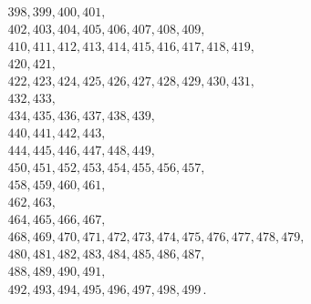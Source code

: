 \begin{multline}
398, 399, 400, 401, \\
402, 403, 404, 405, 406, 407, 408, 409, \\
410, 411, 412, 413, 414, 415, 416, 417, 418, 419, \\
420, 421, \\
422, 423, 424, 425, 426, 427, 428, 429, 430, 431, \\
432, 433, \\
434, 435, 436, 437, 438, 439, \\
440, 441, 442, 443, \\
444, 445, 446, 447, 448, 449, \\
450, 451, 452, 453, 454, 455, 456, 457, \\
458, 459, 460, 461, \\
462, 463, \\
464, 465, 466, 467, \\
468, 469, 470, 471, 472, 473, 474, 475, 476, 477, 478, 479, \\
480, 481, 482, 483, 484, 485, 486, 487, \\
488, 489, 490, 491, \\
492, 493, 494, 495, 496, 497, 498, 499 \,.
\end{multline}
\nextlipsum

\nolinenumbers


